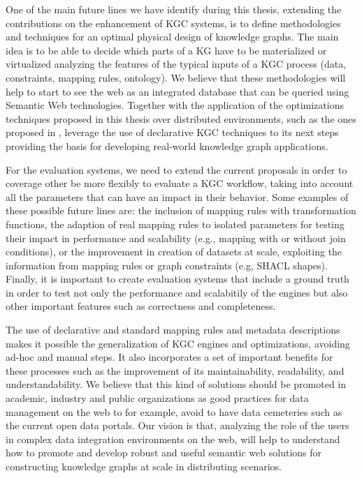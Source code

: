 One of the main future lines we have identify during this thesis, extending the contributions on the enhancement of KGC systems, is to define methodologies and techniques for an optimal physical design of knowledge graphs. The main idea is to be able to decide which parts of a KG have to be materialized or virtualized analyzing the features of the typical inputs of a KGC process (data, constraints, mapping rules, ontology). We believe that these methodologies will help to start to see the web as an integrated database that can be queried using Semantic Web technologies. Together with the application of the optimizations techniques proposed in this thesis over distributed environments, such as the ones proposed in \citep{endris2019ontario,mami2019squerall}, leverage the use of declarative KGC techniques to its next steps providing the basis for developing real-world knowledge graph applications.

For the evaluation systems, we need to extend the current proposals in order to coverage other be more flexibly to evaluate a KGC workflow, taking into account all the parameters that can have an impact in their behavior. Some examples of these possible future lines are: the inclusion of mapping rules with transformation functions, the adaption of real mapping rules to isolated parameters for testing their impact in performance and scalability (e.g., mapping with or without join conditions), or the improvement in creation of datasets at scale, exploiting the information from mapping rules or graph constraints (e.g, SHACL shapes). Finally, it is important to create evaluation systems that include a ground truth in order to test not only the performance and scalabitily of the engines but also other important features such as correctness and completeness.

The use of declarative and standard mapping rules and metadata descriptions makes it possible the generalization of KGC engines and optimizations, avoiding ad-hoc and manual steps. It also incorporates a set of important benefits for these processes such as the improvement of its maintainability, readability, and understandability. We believe that this kind of solutions should be promoted in academic, industry and public organizations as good practices for data management on the web to for example, avoid to have data cemeteries such as the current open data portals. Our vision is that, analyzing the role of the users in complex data integration environments on the web, will help to understand how to promote and develop robust and useful semantic web solutions for constructing knowledge graphs at scale in distributing scenarios.

